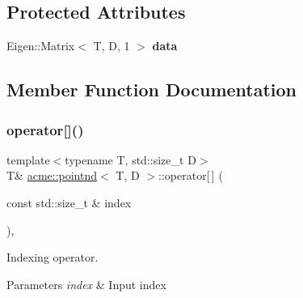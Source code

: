 \subsection*{Protected Attributes}
\begin{DoxyCompactItemize}
\item 
\mbox{\label{classacme_1_1pointnd_a13b19080ed617e2a9c5d6058f07d4f4b}} 
Eigen\+::\+Matrix$<$ T, D, 1 $>$ {\bfseries data}
\end{DoxyCompactItemize}


\subsection{Member Function Documentation}
\mbox{\label{classacme_1_1pointnd_a35b0691673728d98d455c007612d6b91}} 
\subsubsection{\texorpdfstring{operator[]()}{operator[]()}\hspace{0.1cm}{\footnotesize\ttfamily [1/2]}}
{\footnotesize\ttfamily template$<$typename T, std\+::size\+\_\+t D$>$ \\
T\& \hyperlink{classacme_1_1pointnd}{acme\+::pointnd}$<$ T, D $>$\+::operator\mbox{[}$\,$\mbox{]} (\begin{DoxyParamCaption}\item[{const std\+::size\+\_\+t \&}]{index }\end{DoxyParamCaption})\hspace{0.3cm}{\ttfamily [inline]}, {\ttfamily [inherited]}}



Indexing operator. 


\begin{DoxyParams}{Parameters}
{\em index} & Input index \\
\hline
\end{DoxyParams}
\mbox{\label{classacme_1_1pointnd_a565e9ed195c8f8dadc570a029a3deb94}} 

